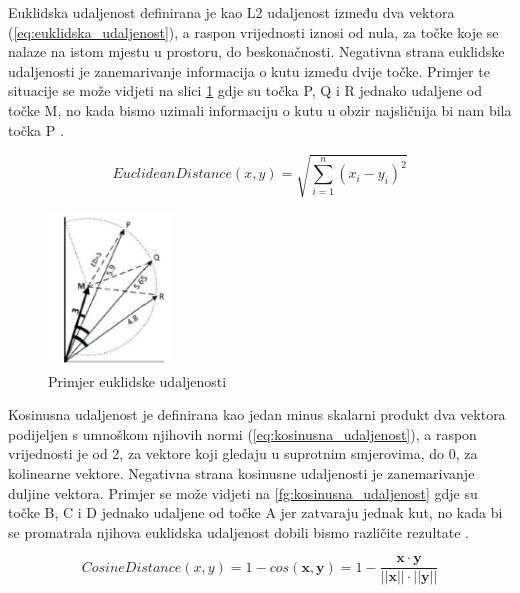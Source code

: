 \documentclass[times, utf8, proizvoljni, numeric]{fer}
\begin{document}
Euklidska udaljenost definirana je kao L2 udaljenost između dva vektora (\ref{eq:euklidska_udaljenost}), a raspon vrijednosti iznosi od nula, za točke koje se nalaze na istom mjestu u prostoru, do beskonačnosti. Negativna strana euklidske udaljenosti je zanemarivanje informacija o kutu između dvije točke. Primjer te situacije se može vidjeti na slici \ref{fg:euklidska_udaljenost} gdje su točka P, Q i R jednako udaljene od točke M, no kada bismo uzimali informaciju o kutu u obzir najsličnija bi nam bila točka P \cite{VectorSimilarity}.

\begin{equation}
\label{eq:euklidska_udaljenost}
EuclideanDistance(x,y) = \sqrt{\sum_{i=1}^n (x_i-y_i)^2}    
\end{equation}

\begin{figure}[!ht]
	\begin{center}
		\captionsetup{justification=centering}
		\includegraphics[width=0.3\textwidth]{./imgs/euklidska_udaljenost.png}
		\caption{Primjer euklidske udaljenosti \cite{VectorSimilarity}}
		\label{fg:euklidska_udaljenost}
	\end{center}
\end{figure}

Kosinusna udaljenost je definirana kao jedan minus skalarni produkt dva vektora podijeljen s umnoškom njihovih normi (\ref{eq:kosinusna_udaljenost}), a raspon vrijednosti je od 2, za vektore koji gledaju u suprotnim smjerovima, do 0, za kolinearne vektore. Negativna strana kosinusne udaljenosti je zanemarivanje duljine vektora. Primjer se može vidjeti na \ref{fg:kosinusna_udaljenost} gdje su točke B, C i D jednako udaljene od točke A jer zatvaraju jednak kut, no kada bi se promatrala njihova euklidska udaljenost dobili bismo različite rezultate \cite{VectorSimilarity}.

\begin{equation}
\label{eq:kosinusna_udaljenost}
CosineDistance(x,y) = 1- cos(\pmb x, \pmb y) = 1 - \frac {\pmb x \cdot \pmb y}{||\pmb x|| \cdot ||\pmb y||}
\end{equation}
\end{document}

